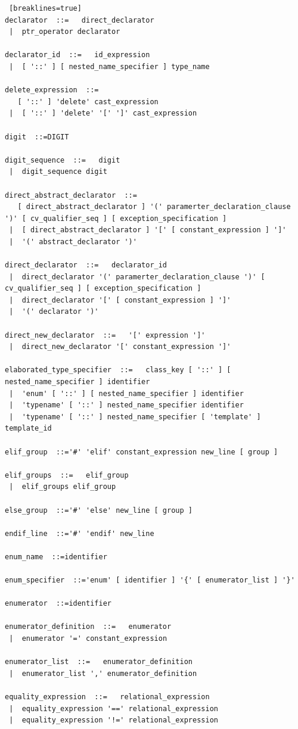 \documentclass[11pt]{book}
\begin{document}
\begin{lstlisting} [breaklines=true]
declarator  ::=   direct_declarator
 |  ptr_operator declarator

declarator_id  ::=   id_expression
 |  [ '::' ] [ nested_name_specifier ] type_name

delete_expression  ::=
   [ '::' ] 'delete' cast_expression
 |  [ '::' ] 'delete' '[' ']' cast_expression

digit  ::=DIGIT

digit_sequence  ::=   digit
 |  digit_sequence digit

direct_abstract_declarator  ::=
   [ direct_abstract_declarator ] '(' paramerter_declaration_clause ')' [ cv_qualifier_seq ] [ exception_specification ]
 |  [ direct_abstract_declarator ] '[' [ constant_expression ] ']'
 |  '(' abstract_declarator ')'

direct_declarator  ::=   declarator_id
 |  direct_declarator '(' paramerter_declaration_clause ')' [ cv_qualifier_seq ] [ exception_specification ]
 |  direct_declarator '[' [ constant_expression ] ']'
 |  '(' declarator ')'

direct_new_declarator  ::=   '[' expression ']'
 |  direct_new_declarator '[' constant_expression ']'

elaborated_type_specifier  ::=   class_key [ '::' ] [ nested_name_specifier ] identifier
 |  'enum' [ '::' ] [ nested_name_specifier ] identifier
 |  'typename' [ '::' ] nested_name_specifier identifier
 |  'typename' [ '::' ] nested_name_specifier [ 'template' ] template_id

elif_group  ::='#' 'elif' constant_expression new_line [ group ]

elif_groups  ::=   elif_group
 |  elif_groups elif_group

else_group  ::='#' 'else' new_line [ group ]

endif_line  ::='#' 'endif' new_line

enum_name  ::=identifier

enum_specifier  ::='enum' [ identifier ] '{' [ enumerator_list ] '}'

enumerator  ::=identifier

enumerator_definition  ::=   enumerator
 |  enumerator '=' constant_expression

enumerator_list  ::=   enumerator_definition
 |  enumerator_list ',' enumerator_definition

equality_expression  ::=   relational_expression
 |  equality_expression '==' relational_expression
 |  equality_expression '!=' relational_expression


\end{lstlisting}
\end{document}
